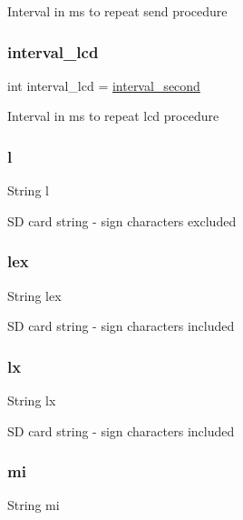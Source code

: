Interval in ms to repeat send procedure \mbox{\label{_w_s_8ino_a64d680b4be82b34d0731c9dd84986ead}} 
\subsubsection{\texorpdfstring{interval\+\_\+lcd}{interval\_lcd}}
{\footnotesize\ttfamily int interval\+\_\+lcd = \hyperlink{_w_s_8ino_a0a56e85c196bfb2b3bf61abe7f007541}{interval\+\_\+second}}

Interval in ms to repeat lcd procedure \mbox{\label{_w_s_8ino_a3d755e761d498d63ec8ff4ba107f9b37}} 
\subsubsection{\texorpdfstring{l}{l}}
{\footnotesize\ttfamily String l}

SD card string -\/ sign characters excluded \mbox{\label{_w_s_8ino_a50a22a42df187974707beaeeb46ee1ec}} 
\subsubsection{\texorpdfstring{lex}{lex}}
{\footnotesize\ttfamily String lex}

SD card string -\/ sign characters included \mbox{\label{_w_s_8ino_a27093eb2a51400e98a5a829312514cab}} 
\subsubsection{\texorpdfstring{lx}{lx}}
{\footnotesize\ttfamily String lx}

SD card string -\/ sign characters included \mbox{\label{_w_s_8ino_a27f338e2e1e0c6b4e800a9a05aeeb00f}} 
\subsubsection{\texorpdfstring{mi}{mi}}
{\footnotesize\ttfamily String mi}

